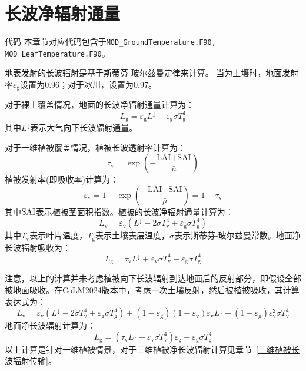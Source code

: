 \section{长波净辐射通量}\label{长波净辐射通量}
\begin{mymdframed}{代码}
  本章节对应代码包含于\texttt{MOD\_GroundTemperature.F90, MOD\_LeafTemperature.F90}。
\end{mymdframed}

地表发射的长波辐射是基于斯蒂芬-玻尔兹曼定律来计算。
当为土壤时，地面发射率$\varepsilon_{\mathrm {g}}$设置为0.96；对于冰川，设置为0.97。

对于裸土覆盖情况，地面的长波净辐射通量计算为：
\begin{equation}
  L_{\mathrm{g}} =\varepsilon_{\mathrm{g}} L ^\downarrow - \varepsilon_{\mathrm{g}} \sigma T_{\mathrm{g}}^{4}
\end{equation}
其中$L ^\downarrow$表示大气向下长波辐射通量。

对于一维植被覆盖情况，植被长波透射率计算为：
\begin{equation}
  \tau_{\mathrm{v}}=\exp \left(-\frac{\text{LAI+SAI}}{\bar{\mu}}\right)
\end{equation}
植被发射率(即吸收率)计算为：
\begin{equation}
  \varepsilon_{\mathrm{v}}=1-\exp \left(-\frac{\text{LAI+SAI}}{\bar{\mu}}\right)=1-\tau _{\mathrm {v}}
\end{equation}
其中$\rm SAI$表示植被茎面积指数。植被的长波净辐射通量计算为：
\begin{equation}
  L_{\mathrm{v}}=\varepsilon_{\mathrm{v}}\left(L ^\downarrow-2 \sigma T_{\mathrm{v}}^{4}+\varepsilon_{\mathrm{g}} \sigma T_{\mathrm{g}}^{4}\right)
\end{equation}
其中$T_{\mathrm {v}}$表示叶片温度，$T_{\mathrm {g}}$表示土壤表层温度，$\sigma$表示斯蒂芬-玻尔兹曼常数。地面净长波辐射吸收为：
\begin{equation}\label{eq:lg1}
  L_{\mathrm {g}}= \tau_{\mathrm{v}} L ^\downarrow + \varepsilon_{\mathrm{v}} \sigma T_{\mathrm{v}}^4 - \varepsilon_{\mathrm{g}} \sigma T_{\mathrm{g}}^{4}
\end{equation}

注意，以上的计算并未考虑植被向下长波辐射到达地面后的反射部分，即假设全部被地面吸收。在CoLM2024版本中，考虑一次土壤反射，然后被植被吸收，其计算表达式为：
\begin{equation}
  L_{\mathrm{v}}=\varepsilon_{\mathrm{v}}\left(L ^\downarrow-2 \sigma T_{\mathrm{v}}^{4}+\varepsilon_{\mathrm{g}} \sigma T_{\mathrm{g}}^{4}\right)+\left(1-\varepsilon_{\mathrm{g}}\right)\left(1-\varepsilon_{\mathrm{v}}\right) \varepsilon_{\mathrm{v}} L ^\downarrow+\left(1-\varepsilon_{\mathrm{g}}\right) \varepsilon_{\mathrm{v}}^{2} \sigma T_{\mathrm{v}}^{4}
\end{equation}
地面净长波辐射计算为：
\begin{equation}\label{eq:lg2}
  L_{\mathrm{g}}=\left(\tau_{\mathrm{v}} L ^\downarrow  + \varepsilon_{\mathrm{v}} \sigma T_{\mathrm{v}}^{4} \right) \varepsilon_{\mathrm{g}} - \varepsilon_{\mathrm{g}} \sigma T_{\mathrm{g}}^{4}
\end{equation}
以上计算是针对一维植被情景，对于三维植被净长波辐射计算见章节~\ref{三维植被长波辐射传输}。

